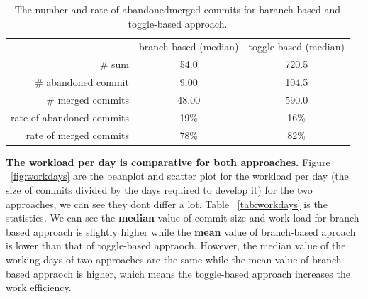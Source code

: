\begin{table}
	\caption{The number and rate of abandoned\/merged commits for baranch-based and toggle-based approach.}
	\label{tab:abandonedMergedCommits}
	\begin{tabular}{r|c|c}
			& branch-based (median) & toggle-based (median) \\
		\# sum & 54.0 & 720.5 \\
		\# abandoned commit & 9.00 & 104.5 \\
		\# merged commits & 48.00 & 590.0 \\
		rate of abandoned commits & 19\% & 16\% \\
		rate of merged commits & 78\% & 82\% \\
	\end{tabular}
\end{table}


\textbf{The workload per day is comparative for both approaches.} Figure ~\ref{fig:workdays} are the beanplot and scatter plot for the workload per day (the size of commits divided by the days required to develop it) for the two approaches, we can see they dont differ a lot. Table ~\ref{tab:workdays} is the statistics. We can see the \textbf{median} value of commit size and work load for branch-based approach is slightly higher while the \textbf{mean} value of branch-based aproach is lower than that of toggle-based appraoch. However, the median value of the working days of two approaches are the same while the mean value of branch-based appraoch is higher, which means the toggle-based approach increases the work efficiency.


